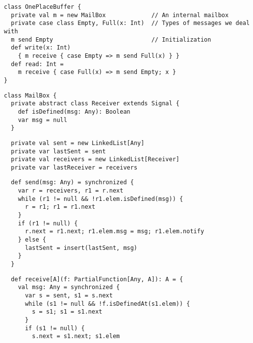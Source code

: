 \begin{itemize}
\begin{lstlisting}
class OnePlaceBuffer {
  private val m = new MailBox             // An internal mailbox
  private case class Empty, Full(x: Int)  // Types of messages we deal with
  m send Empty                            // Initialization
  def write(x: Int)
    { m receive { case Empty => m send Full(x) } }
  def read: Int =
    m receive { case Full(x) => m send Empty; x }
}
\end{lstlisting}
\begin{lstlisting}
class MailBox {
  private abstract class Receiver extends Signal {
    def isDefined(msg: Any): Boolean
    var msg = null
  }
\end{lstlisting}
\begin{lstlisting}
  private val sent = new LinkedList[Any]
  private var lastSent = sent
  private val receivers = new LinkedList[Receiver]
  private var lastReceiver = receivers
\end{lstlisting}
\begin{lstlisting}
  def send(msg: Any) = synchronized {
    var r = receivers, r1 = r.next
    while (r1 != null && !r1.elem.isDefined(msg)) {
      r = r1; r1 = r1.next
    }
    if (r1 != null) {
      r.next = r1.next; r1.elem.msg = msg; r1.elem.notify
    } else {
      lastSent = insert(lastSent, msg)
    }
  }
\end{lstlisting}
\begin{lstlisting}
  def receive[A](f: PartialFunction[Any, A]): A = {
    val msg: Any = synchronized {
      var s = sent, s1 = s.next
      while (s1 != null && !f.isDefinedAt(s1.elem)) {
        s = s1; s1 = s1.next
      }
      if (s1 != null) {
        s.next = s1.next; s1.elem

\end{lstlisting}
\end{itemize}
